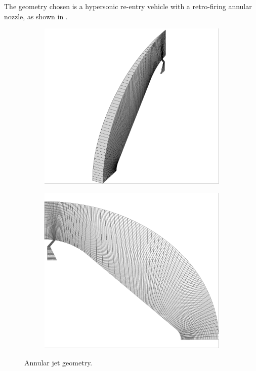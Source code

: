 The geometry chosen is a hypersonic re-entry vehicle with a retro-firing annular
nozzle, as shown in .
\begin{figure}[h]
  \centering
	\begin{subfigure}[b]{0.4\textwidth}
    \centering
    \includegraphics[width=\textwidth]{figures/iso-coarse.png}
  \end{subfigure}
	\begin{subfigure}[b]{0.4\textwidth}
    \centering
    \includegraphics[width=\textwidth]{figures/side-coarse.png}
  \end{subfigure}
  \caption{Annular jet geometry.}
  \label{fig:annular-jet-side}
\end{figure}

